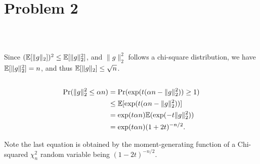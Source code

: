 \section{Problem 2}~\label{sec:prob2}

\subsection{} %

Since $({\mathbb{E}}[\|g\|_2])^2 \le {\mathbb{E}}[\|g\|_2^2]$,
and $\|g\|_2^2$ follows a chi-square distribution,
we have ${\mathbb{E}}[\|g\|_2^2]=n$,
and thus ${\mathbb{E}}[\|g\|_2]\le \sqrt{n}$.

\subsection{} %

\begin{equation}
\begin{split}
{\text{Pr}}(\|g\|_2^2\le\alpha n) & = {\text{Pr}}(\exp(t(\alpha n-\|g\|_2^2))\ge 1) \\
    & \le  {\mathbb{E}}[\exp(t(\alpha n-\|g\|_2^2))]  \\
    & = \exp(t\alpha n) {\mathbb{E}}(\exp(-t\|g\|_2^2))   \\
    & = \exp(t\alpha n) (1+2t)^{-n/2}. \\
\end{split}
\end{equation}

Note the last equation is obtained by the moment-generating
function of a Chi-squared $\chi^2_n$ random variable
being $(1-2t)^{-n/2}$.
